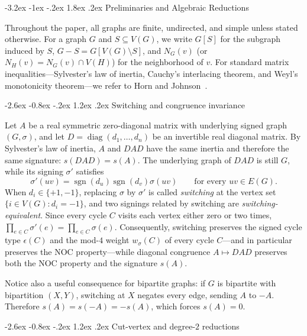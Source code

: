 \documentclass[10pt,letterpaper]{article}
\makeatletter
\renewcommand\section{\@startsection{section}{1}{\z@}%
  {-3.2ex \@plus -1ex \@minus -.2ex}%
  {1.8ex \@plus .2ex}%
  {\normalfont\large\bfseries}}
\renewcommand\subsection{\@startsection{subsection}{2}{\z@}%
  {-2.6ex \@plus -0.8ex \@minus -.2ex}%
  {1.2ex \@plus .2ex}%
  {\normalfont\normalsize\bfseries}}
\theoremstyle{zetaplain}
\theoremstyle{zetadef}
\theoremstyle{remark}
\numberwithin{equation}{section}
\DeclareMathOperator{\sgn}{sgn}
\DeclareMathOperator{\diag}{diag}
\makeatother
\begin{document}
\section{Preliminaries and Algebraic Reductions}\label{sec:prelim}

Throughout the paper, all graphs are finite, undirected, and simple unless stated otherwise. For a graph $G$ and $S \subseteq V(G)$, we write $G[S]$ for the subgraph induced by $S$, $G - S = G[V(G) \setminus S]$, and $N_G(v)$ (or $N_H(v) = N_G(v) \cap V(H)$) for the neighborhood of $v$. For standard matrix inequalities—Sylvester's law of inertia, Cauchy's interlacing theorem, and Weyl's monotonicity theorem—we refer to Horn and Johnson~\cite{HJ13}.

\subsection{Switching and congruence invariance}

Let $A$ be a real symmetric zero-diagonal matrix with underlying signed graph $(G, \sigma)$, and let $D = \diag(d_1, \dots, d_n)$ be an invertible real diagonal matrix. By Sylvester's law of inertia, $A$ and $DAD$ have the same inertia and therefore the same signature: $s(DAD) = s(A)$. The underlying graph of $DAD$ is still $G$, while its signing $\sigma'$ satisfies
\[
  \sigma'(uv) = \sgn(d_u)\sgn(d_v)\sigma(uv) \qquad \text{for every } uv \in E(G).
\]
When $d_i \in \{+1, -1\}$, replacing $\sigma$ by $\sigma'$ is called \emph{switching} at the vertex set $\{i \in V(G) : d_i = -1\}$, and two signings related by switching are \emph{switching-equivalent}. Since every cycle $C$ visits each vertex either zero or two times, $\prod_{e \in C} \sigma'(e) = \prod_{e \in C} \sigma(e)$. Consequently, switching preserves the signed cycle type $\epsilon(C)$ and the mod-$4$ weight $w_\sigma(C)$ of every cycle $C$—and in particular preserves the NOC property—while diagonal congruence $A \mapsto DAD$ preserves both the NOC property and the signature $s(A)$.

Notice also a useful consequence for bipartite graphs: if $G$ is bipartite with bipartition $(X, Y)$, switching at $X$ negates every edge, sending $A$ to $-A$. Therefore $s(A) = s(-A) = -s(A)$, which forces $s(A) = 0$.

\subsection{Cut-vertex and degree-\texorpdfstring{$2$}{2} reductions}
\end{document}
